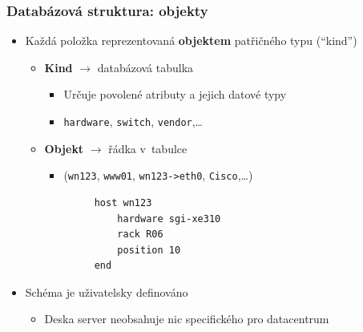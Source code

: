 \documentclass{beamer}
\begin{document}
\begin{frame}[fragile]
\frametitle{Databázová struktura: objekty}
\begin{itemize}
    \item Každá položka reprezentovaná {\bf objektem} patřičného typu (``kind'')
        \begin{itemize}
            \item {\bf Kind} $\rightarrow$ databázová tabulka
                \begin{itemize}
                    \item Určuje povolené atributy a jejich datové typy
                    \item {\tt hardware}, {\tt switch}, {\tt vendor},\ldots
                \end{itemize}
            \item {\bf Objekt} $\rightarrow$ řádka v~tabulce
                \begin{itemize}
                    \item ({\tt wn123}, {\tt www01}, {\tt wn123->eth0}, {\tt Cisco},\ldots)
                \end{itemize}
        \end{itemize}
        \begin{verbatim}
            host wn123
                hardware sgi-xe310
                rack R06
                position 10
            end
        \end{verbatim}
    \item Schéma je uživatelsky definováno
        \begin{itemize}
            \item Deska server neobsahuje nic specifického pro datacentrum
        \end{itemize}
\end{itemize}
\end{frame}
\end{document}
